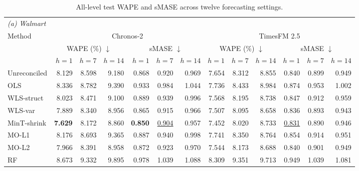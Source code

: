 \begin{table}[!htbp]
\centering
\begingroup
\renewcommand{\baselinestretch}{1}\small
\caption{All-level test WAPE and sMASE across twelve forecasting settings.}
\label{tab:main_wape}
\fontsize{8.5}{10}\selectfont
\renewcommand{\arraystretch}{0.95}
\setlength{\tabcolsep}{2pt}
\begin{tabular*}{\textwidth}{@{\extracolsep{\fill}}l*{12}{r}@{}}
\toprule
\multicolumn{13}{l}{\textit{(a) Walmart}} \\
Method & \multicolumn{6}{c}{Chronos-2} & \multicolumn{6}{c}{TimesFM 2.5} \\
\cmidrule(lr){2-7}\cmidrule(l){8-13}
 & \multicolumn{3}{c}{WAPE (\%) $\downarrow$} & \multicolumn{3}{c}{sMASE $\downarrow$} & \multicolumn{3}{c}{WAPE (\%) $\downarrow$} & \multicolumn{3}{c}{sMASE $\downarrow$} \\
\cmidrule(lr){2-4}\cmidrule(lr){5-7}\cmidrule(lr){8-10}\cmidrule(l){11-13}
 & $h=1$ & $h=7$ & $h=14$ & $h=1$ & $h=7$ & $h=14$ & $h=1$ & $h=7$ & $h=14$ & $h=1$ & $h=7$ & $h=14$ \\
\midrule
Unreconciled & 8.129 & 8.598 & 9.180 & 0.868 & 0.920 & 0.969 & 7.654 & 8.312 & 8.855 & 0.840 & 0.899 & 0.949 \\
OLS & 8.336 & 8.782 & 9.390 & 0.933 & 0.984 & 1.044 & 7.736 & 8.433 & 8.984 & 0.874 & 0.953 & 1.002 \\
WLS-struct & 8.023 & 8.471 & 9.100 & 0.889 & 0.939 & 0.996 & 7.568 & 8.195 & 8.738 & 0.847 & 0.912 & 0.959 \\
WLS-var & 7.889 & 8.340 & 8.956 & 0.865 & 0.915 & 0.966 & 7.507 & 8.095 & 8.658 & 0.836 & 0.893 & 0.943 \\
MinT-shrink & \cellcolor{accuracybest}\textbf{7.629} & 8.172 & 8.860 & \cellcolor{accuracybest}\textbf{0.850} & \cellcolor{accuracysecond}\underline{0.904} & 0.957 & 7.452 & 8.020 & 8.733 & \cellcolor{accuracysecond}\underline{0.831} & 0.890 & 0.946 \\
MO-L1 & 8.176 & 8.693 & 9.365 & 0.887 & 0.940 & 0.998 & 7.741 & 8.350 & 8.764 & 0.854 & 0.914 & 0.951 \\
MO-L2 & 7.966 & 8.391 & 8.958 & 0.872 & 0.923 & 0.970 & 7.544 & 8.173 & 8.688 & 0.840 & 0.901 & 0.949 \\
RF & 8.673 & 9.332 & 9.895 & 0.978 & 1.039 & 1.088 & 8.309 & 9.351 & 9.713 & 0.949 & 1.039 & 1.081 \\

\end{tabular*}
\end{table}
